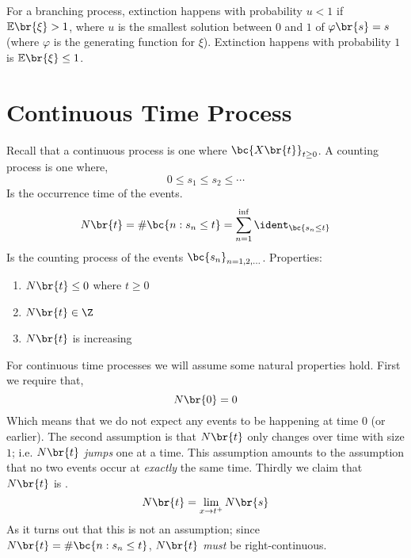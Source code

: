 \documentclass{article}
\newcommand{\Exp}{\mathbb{E}}
\begin{document}
    For a branching process, extinction happens with probability $u < 1$ if $\Exp\br{\xi} > 1$, where $u$ is the smallest solution between $0$ and $1$ of $\varphi\br{s} = s$ (where $\varphi$ is the generating function for $\xi$). Extinction happens with probability $1$ is $\Exp\br{\xi} \leq 1$. \\

    \section{Continuous Time Process}
    Recall that a continuous process is one where $\bc{X\br{t}}_{t \geq 0}$. A counting process is one where,
    \[ 0 \leq s_1 \leq s_2 \leq \cdots \]
    Is the occurrence time of the events.
    \[ N\br{t} = \# \bc{n : s_n \leq t} = \sum_{n=1}^{\inf} \ident_{\bc{s_n \leq t}} \]
    Is the counting process of the events $\bc{s_n}_{n=1,2,\ldots}$. Properties:
    \begin{enumerate}
        \item $N\br{t} \leq 0$ where $t \geq 0$
        \item $N\br{t} \in \Z$
        \item $N\br{t}$ is increasing
    \end{enumerate}
    For continuous time processes we will assume some natural properties hold. First we require that,
    \[ N\br{0} = 0 \]
    Which means that we do not expect any events to be happening at time $0$ (or earlier). The second assumption is that $N\br{t}$ only changes over time with size $1$; i.e. $N\br{t}$ \textit{jumps} one at a time. This assumption amounts to the assumption that no two events occur at \textit{exactly} the same time. Thirdly we claim that $N\br{t}$ is .
    \[ N\br{t} = \lim_{x \to t^{+}} N\br{s} \]
    As it turns out that this is not an assumption; since $N\br{t} = \# \bc{n : s_n \leq t}$, $N\br{t}$ \textit{must} be right-continuous.
\end{document}

